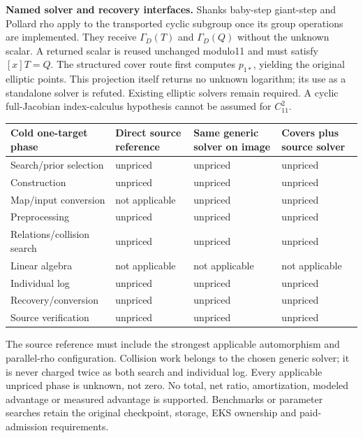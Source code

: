 \documentclass[10pt,a4paper]{article}
\begin{document}
\textbf{Named solver and recovery interfaces.} Shanks baby-step giant-step
and Pollard rho apply to the transported cyclic subgroup once its group
operations are implemented. They receive $\Gamma_D(T)$ and
$\Gamma_D(Q)$ without the unknown scalar. A returned scalar is reused
unchanged modulo11 and must satisfy $[x]T=Q$. The structured cover route
first computes $p_{1*}$, yielding the original elliptic points. This
projection itself returns no unknown logarithm; its use as a standalone
solver is refuted. Existing elliptic solvers remain required. A cyclic
full-Jacobian index-calculus hypothesis cannot be assumed for $C_{11}^2$.

\begin{center}\small
\begin{tabular}{p{39mm}p{35mm}p{35mm}p{35mm}}
\toprule
Cold one-target phase & Direct source reference & Same generic solver on image & Covers plus source solver\\
\midrule
Search/prior selection & unpriced & unpriced & unpriced\\
Construction & unpriced & unpriced & unpriced\\
Map/input conversion & not applicable & unpriced & unpriced\\
Preprocessing & unpriced & unpriced & unpriced\\
Relations/collision search & unpriced & unpriced & unpriced\\
Linear algebra & not applicable & not applicable & not applicable\\
Individual log & unpriced & unpriced & unpriced\\
Recovery/conversion & unpriced & unpriced & unpriced\\
Source verification & unpriced & unpriced & unpriced\\
\bottomrule
\end{tabular}\end{center}
The source reference must include the strongest applicable automorphism
and parallel-rho configuration. Collision work belongs to the chosen
generic solver; it is never charged twice as both search and individual
log. Every applicable unpriced phase is unknown, not zero. No total,
net ratio, amortization, modeled advantage or measured advantage is
supported. Benchmarks or parameter searches retain the original
checkpoint, storage, EKS ownership and paid-admission requirements.
\end{document}
